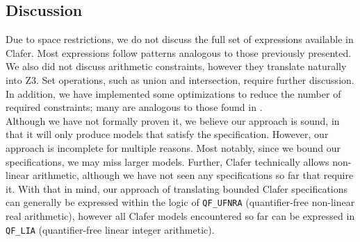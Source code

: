 \documentclass{easychair}
\begin{document}
\subsection{Discussion}
Due to space restrictions, we do not discuss the full set of expressions available in Clafer. Most expressions follow patterns analogous to those previously presented. We also did not discuss arithmetic constraints, however they translate naturally into Z3. Set operations, such as union and intersection, require further discussion. In addition, we have implemented some optimizations to reduce the number of required constraints; many are analogous to those found in \cite{Liang}. \\
\indent Although we have not formally proven it, we believe our approach is sound, in that it will only produce models that satisfy the specification. However, our approach is incomplete for multiple reasons. Most notably, since we bound our specifications, we may miss larger models. Further, Clafer technically allows non-linear arithmetic, although we have not seen any specifications so far that require it. With that in mind, our approach of translating bounded Clafer specifications can generally be expressed within the logic of \texttt{QF\_UFNRA} (quantifier-free non-linear real arithmetic), however all Clafer models encountered so far can be expressed in \texttt{QF\_LIA} (quantifier-free linear integer arithmetic).



\end{document}
